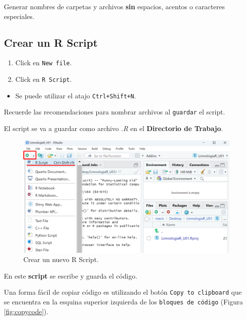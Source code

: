 \documentclass[
]{book}
\providecommand{\tightlist}{%
  \setlength{\itemsep}{0pt}\setlength{\parskip}{0pt}}
\begin{document}
Generar nombres de carpetas y archivos \textbf{sin} espacios, acentos o caracteres especiales.

\hypertarget{crear-un-r-script}{%
\subsection{\texorpdfstring{Crear un \textbf{R Script}}{Crear un R Script}}\label{crear-un-r-script}}

\begin{enumerate}
\def\labelenumi{\arabic{enumi}.}
\tightlist
\item
  Click en \texttt{New\ file}.
\item
  Click en \texttt{R\ Script}.
\end{enumerate}

\begin{itemize}
\tightlist
\item
  Se puede utilizar el atajo \texttt{Ctrl+Shift+N}.
\end{itemize}

Recuerde las recomendaciones para nombrar archivos al \texttt{guardar} el script.

El script se va a guardar como archivo \emph{.R} en el \textbf{Directorio de Trabajo}.

\begin{figure}

{\centering \includegraphics[width=0.75\linewidth]{./images/script} 

}

\caption{Crear un nuevo R Script.}\label{fig:script}
\end{figure}

En este \textbf{script} se escribe y guarda el código.

Una forma fácil de copiar código es utilizando el botón \texttt{Copy\ to\ clipboard} que se encuentra en la esquina superior izquierda de los \texttt{bloques\ de\ código} (Figura \ref{fig:copycode}).
\end{document}
